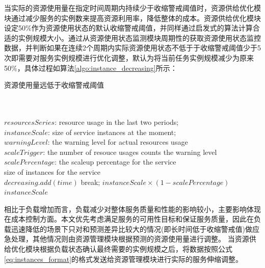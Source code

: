 当实际的资源使用量在指定时间周期内持续少于收缩警戒阈值时，资源供给优化模块通过减少服务的实例数来提高资源利用率，降低整体的成本。资源供给优化模块设定50\%作为资源使用状态的默认收缩警戒阈值，并同样通过启发式的算法计算合适的实例规模大小。通过从资源使用状态监测模块周期性的获取资源使用状态监控数据，并判断如果在连续2个周期内实际资源使用状态不低于于收缩警戒阈值少于5次即需要对服务实例规模进行优化调整，默认为将当前任务实例规模减少为原来50\%，具体过程如算法\ref{algo:instance_decreasing}所示：
\begin{algorithm}[H]
\caption{资源使用量远低于收缩警戒阈值}
\label{algo:instance_decreasing}
\begin{algorithmic}[0]
\\
\Require ~~\
\\
$resourcesSeries$: resource usage in the last two periods;\\
$instanceScale$: size of service instances at the moment;\\
$warningLevel$: the warning level for actual resources usage \\
$scaleTrigger$: the number of resouce usages counts the warning level \\
$scalePercentage$: the scaleup percentage for the service
\Ensure ~~\
\\
size of instances for the service \\

            \State $decreasing.add(time)$
            \State break;
        \EndIf
    \EndFor
        \State \Return $instanceScale \times (1-scalePercentage)$
    \Else
        \State \Return $instanceScale$
    \EndIf
\EndFor
\end{algorithmic}
\end{algorithm}

相比于负载增加而言，负载减少对整体服务质量和性能的影响较小，主要影响体现在成本控制方面。本文优先考虑满足服务的可用性目标和保证服务质量，因此在负载迅速降低的场景下只对和预测差异比较大的情况(即长时间低于收缩警戒值)做应急处理，其他情况则由资源管理模块根据预测的资源使用量进行调整。
当资源供给优化模块根据负载状态确认最终需要的实例规模之后，将数据按照公式\ref{eq:instances_format}的格式发送给资源管理模块进行实际的服务伸缩调整。


